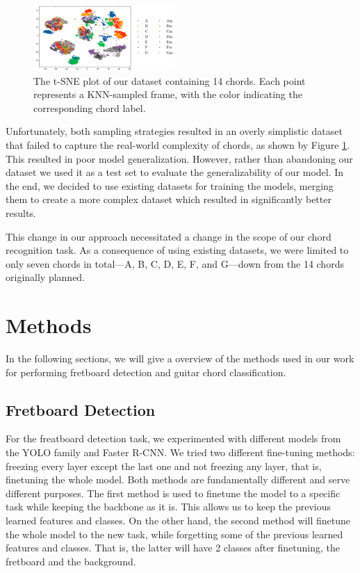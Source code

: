 \documentclass[10pt,twocolumn,letterpaper]{article}
\begin{document}
\begin{figure}[h]
    \centering
    \includegraphics[width=0.48\textwidth]{images/final/Guitar-chords-ours_t-sne_plot.png}
    \caption{The t-SNE plot of our dataset containing 14 chords. Each point represents a KNN-sampled frame, with the color indicating the corresponding chord label.}
    \label{fig:ours-tsne-plot}
\end{figure}

Unfortunately, both sampling strategies resulted in an overly simplistic dataset that failed to capture the real-world complexity of chords, as shown by Figure \ref{fig:ours-tsne-plot}. This resulted in poor model generalization. However, rather than abandoning our dataset we used it as a test set to evaluate the generalizability of our model. In the end, we decided to use existing datasets \cite{guitar-chord-tvon8_dataset,guitar-chord-bounding-box_dataset, guitar-chord-handshape_dataset, guitar-chords-daewp_dataset} for training the models, merging them to create a more complex dataset which resulted in significantly better results.

This change in our approach necessitated a change in the scope of our chord recognition task. As a consequence of using existing datasets, we were limited to only seven chords in total—A, B, C, D, E, F, and G—down from the 14 chords originally planned.

\section{Methods}
In the following sections, we will give a overview of the methods used in our work for performing fretboard detection and guitar chord classification.

\subsection{Fretboard Detection}
For the freatboard detection task, we experimented with different models from the YOLO family and Faster R-CNN. We tried two different fine-tuning methods: freezing every layer except the last one and not freezing any layer, that is, finetuning the whole model. Both methods are fundamentally different and serve different purposes. The first method is used to finetune the model to a specific task while keeping the backbone as it is. This allows us to keep the previous learned features and classes. On the other hand, the second method will finetune the
whole model to the new task, while forgetting some of the previous learned features and classes. That is, the latter will have 2 classes after finetuning, the fretboard and the background.
\end{document}
